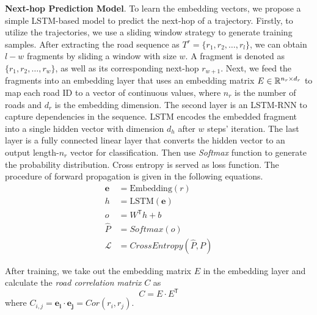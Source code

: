 \textbf{Next-hop Prediction Model}. To learn the embedding vectors, we propose a simple LSTM\cite{LSTM}-based model to predict the next-hop of a trajectory. Firstly, to utilize the trajectories, we use a sliding window strategy to generate training samples. After extracting the road sequence as $T^r=\{r_1, r_2, \dots, r_l \}$, we can obtain $l-w$ fragments by sliding a window with size $w$. A fragment is denoted as $\{r_1, r_2, \dots, r_w\}$, as well as its corresponding next-hop $r_{w+1}$. Next, we feed the fragments into an embedding layer that uses an embedding matrix $E\in\mathbb{R}^{n_r\times d_r}$ to map each road ID to a vector of continuous values, where $n_r$ is the number of roads and $d_r$ is the embedding dimension. The second layer is an LSTM-RNN to capture dependencies in the sequence. LSTM encodes the embedded fragment into a single hidden vector with dimension $d_h$ after $w$ steps' iteration. The last layer is a fully connected linear layer that converts the hidden vector to an output length-$n_r$ vector for classification. Then use \textit{Softmax} function to generate the probability distribution. Cross entropy is served as loss function. The procedure of forward propagation is given in the following equations.
\begin{equation}
    \begin{aligned}
        \mathbf{e}&=\mathrm{Embedding}(r)\\
        h&=\mathrm{LSTM}(\mathbf{e})\\
        o&=W^\mathsf{T}h+b\\
        \hat P&=Softmax(o)\\
        \mathcal{L}&=CrossEntropy(\hat P, P)
    \end{aligned}
\end{equation}

After training, we take out the embedding matrix $E$ in the embedding layer and calculate the \textit{road correlation matrix} $C$ as
\begin{equation}
    C=E\cdot E^\mathsf{T}
\end{equation}
where $C_{i, j}=\mathbf{e_i}\cdot \mathbf{e_j}=Cor(r_i, r_j)$.

